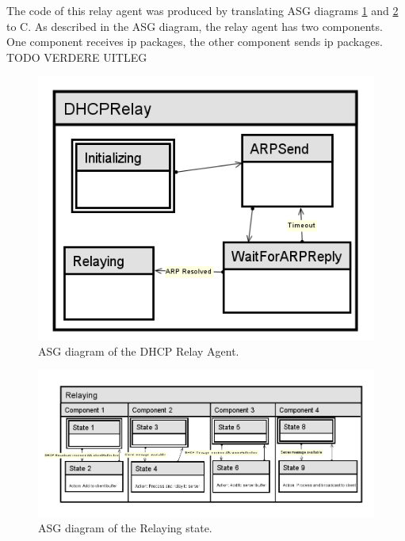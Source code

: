 \documentclass[11pt,a4paper]{scrartcl}
\begin{document}
The code of this relay agent was produced by translating ASG diagrams \ref{fig:asg} and \ref{fig:asgRelaying} to C.
As described in the ASG diagram, the relay agent has two components. One component receives ip packages, the other component sends ip packages. TODO VERDERE UITLEG

\begin{figure}
	\centering
	\includegraphics[width=1.0\textwidth]{../img/dhcprelay-asg.png}
	\caption{ASG diagram of the DHCP Relay Agent.\label{fig:asg}}
\end{figure}

\begin{figure}
	\centering
	\includegraphics[width=1.0\textwidth]{../img/relaying-asg.png}
	\caption{ASG diagram of the Relaying state.\label{fig:asgRelaying}}
\end{figure}
\end{document}
